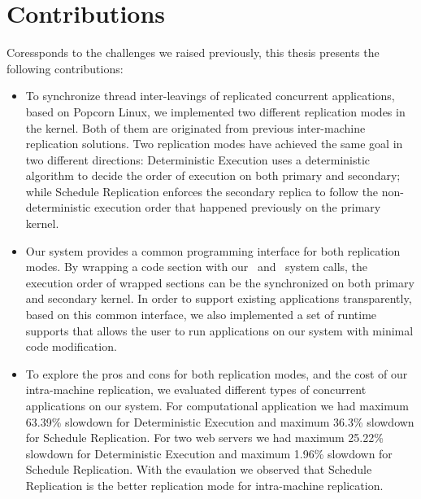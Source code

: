 \section{Contributions}

Coressponds to the challenges we raised previously, this thesis presents the following contributions:

\begin{itemize}
\item To synchronize thread inter-leavings of replicated concurrent applications, based on Popcorn Linux, we implemented two different replication modes in the kernel. Both of them are originated from previous inter-machine replication solutions. Two replication modes have achieved the same goal in two different directions: Deterministic Execution uses a deterministic algorithm to decide the order of execution on both primary and secondary; while Schedule Replication enforces the secondary replica to follow the non-deterministic execution order that happened previously on the primary kernel.

\item Our system provides a common programming interface for both replication modes. By wrapping a code section with our \detstart\ and \detend\ system calls, the execution order of wrapped sections can be the synchronized on both primary and secondary kernel. In order to support existing applications transparently, based on this common interface, we also implemented a set of runtime supports that allows the user to run applications on our system with minimal code modification.

\item To explore the pros and cons for both replication modes, and the cost of our intra-machine replication, we evaluated different types of concurrent applications on our system. For computational application we had maximum 63.39\% slowdown for Deterministic Execution and maximum 36.3\% slowdown for Schedule Replication. For two web servers we had maximum 25.22\% slowdown for Deterministic Execution and maximum 1.96\% slowdown for Schedule Replication. With the evaulation we observed that Schedule Replication is the better replication mode for intra-machine replication.

\end{itemize}

